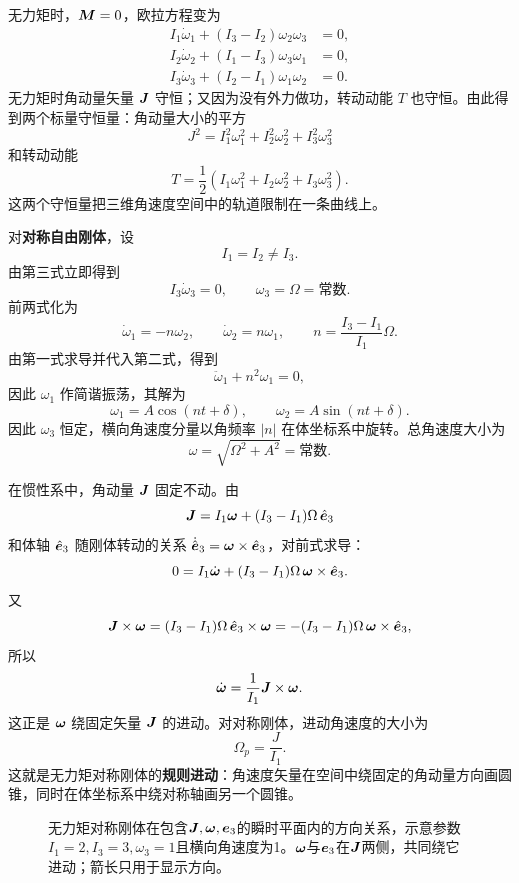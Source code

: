无力矩时，\(\boldsymbol{M}=0\)，欧拉方程变为
\begin{equation}
\begin{aligned}
I_1\dot\omega_1+(I_3-I_2)\omega_2\omega_3&=0,\\
I_2\dot\omega_2+(I_1-I_3)\omega_3\omega_1&=0,\\
I_3\dot\omega_3+(I_2-I_1)\omega_1\omega_2&=0.
\end{aligned}
\label{eq:free-euler}
\end{equation}
无力矩时角动量矢量 \(\boldsymbol{J}\) 守恒；又因为没有外力做功，转动动能 \(T\) 也守恒。由此得到两个标量守恒量：角动量大小的平方
\[
J^2=I_1^2\omega_1^2+I_2^2\omega_2^2+I_3^2\omega_3^2
\]
和转动动能
\[
T=\frac12(I_1\omega_1^2+I_2\omega_2^2+I_3\omega_3^2).
\]
这两个守恒量把三维角速度空间中的轨道限制在一条曲线上。

对\textbf{对称自由刚体}，设
\[
I_1=I_2\ne I_3.
\]
由第三式立即得到
\[
I_3\dot\omega_3=0,
\qquad
\omega_3=\Omega=\text{常数}.
\]
前两式化为
\begin{equation}
\dot\omega_1=-n\omega_2,\qquad
\dot\omega_2=n\omega_1,
\qquad
n=\frac{I_3-I_1}{I_1}\Omega.
\label{eq:free-symmetric-omega}
\end{equation}
由第一式求导并代入第二式，得到
\[
\ddot\omega_1+n^2\omega_1=0,
\]
因此 \(\omega_1\) 作简谐振荡，其解为
\begin{equation}
\omega_1=A\cos(nt+\delta),\qquad
\omega_2=A\sin(nt+\delta).
\label{eq:free-symmetric-solution}
\end{equation}
因此 \(\omega_3\) 恒定，横向角速度分量以角频率 \(|n|\) 在体坐标系中旋转。总角速度大小为
\[
\omega=\sqrt{\Omega^2+A^2}=\text{常数}.
\]

在惯性系中，角动量 \(\boldsymbol{J}\) 固定不动。由
\[
\boldsymbol{J}=I_1\boldsymbol{\omega}+(I_3-I_1)\Omega\,\hat{\boldsymbol{e}}_3
\]
和体轴 \(\hat{\boldsymbol{e}}_3\) 随刚体转动的关系 \(\dot{\hat{\boldsymbol{e}}}_3=\boldsymbol{\omega}\times\hat{\boldsymbol{e}}_3\)，对前式求导：
\[
0=I_1\dot{\boldsymbol{\omega}}+(I_3-I_1)\Omega\,\boldsymbol{\omega}\times\hat{\boldsymbol{e}}_3.
\]
又
\[
\boldsymbol{J}\times\boldsymbol{\omega}
=(I_3-I_1)\Omega\,\hat{\boldsymbol{e}}_3\times\boldsymbol{\omega}
=-(I_3-I_1)\Omega\,\boldsymbol{\omega}\times\hat{\boldsymbol{e}}_3,
\]
所以
\[
\dot{\boldsymbol{\omega}}=\frac1{I_1}\boldsymbol{J}\times\boldsymbol{\omega}.
\]
这正是 \(\boldsymbol{\omega}\) 绕固定矢量 \(\boldsymbol{J}\) 的进动。对对称刚体，进动角速度的大小为
\begin{equation}
\Omega_p=\frac{J}{I_1}.
\label{eq:free-precession}
\end{equation}
这就是无力矩对称刚体的\textbf{规则进动}：角速度矢量在空间中绕固定的角动量方向画圆锥，同时在体坐标系中绕对称轴画另一个圆锥。

\begin{figure}[htbp]
\centering
{}
\caption{无力矩对称刚体在包含$\boldsymbol{J},\boldsymbol{\omega},\boldsymbol{e}_3$的瞬时平面内的方向关系，示意参数$I_1=2,I_3=3,\omega_3=1$且横向角速度为1。$\boldsymbol{\omega}$与$\boldsymbol{e}_3$在$\boldsymbol{J}$两侧，共同绕它进动；箭长只用于显示方向。}
\label{fig:free-top}
\end{figure}

